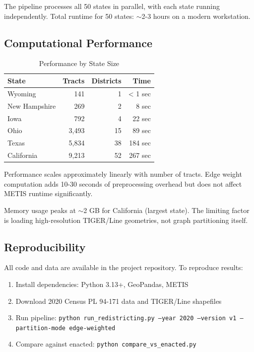 The pipeline processes all 50 states in parallel, with each state running independently. Total runtime for 50 states: $\sim$2-3 hours on a modern workstation.

\subsection{Computational Performance}

\begin{table}[h]
\centering
\caption{Performance by State Size}
\begin{tabular}{lrrr}
\toprule
\textbf{State} & \textbf{Tracts} & \textbf{Districts} & \textbf{Time} \\
\midrule
Wyoming & 141 & 1 & < 1 sec \\
New Hampshire & 269 & 2 & 8 sec \\
Iowa & 792 & 4 & 22 sec \\
Ohio & 3,493 & 15 & 89 sec \\
Texas & 5,834 & 38 & 184 sec \\
California & 9,213 & 52 & 267 sec \\
\bottomrule
\end{tabular}
\end{table}

Performance scales approximately linearly with number of tracts. Edge weight computation adds 10-30 seconds of preprocessing overhead but does not affect METIS runtime significantly.

Memory usage peaks at $\sim$2 GB for California (largest state). The limiting factor is loading high-resolution TIGER/Line geometries, not graph partitioning itself.

\subsection{Reproducibility}

All code and data are available in the project repository. To reproduce results:

\begin{enumerate}
\item Install dependencies: Python 3.13+, GeoPandas, METIS
\item Download 2020 Census PL 94-171 data and TIGER/Line shapefiles
\item Run pipeline: \texttt{python run\_redistricting.py --year 2020 --version v1 --partition-mode edge-weighted}
\item Compare against enacted: \texttt{python compare\_vs\_enacted.py}
\end{enumerate}

